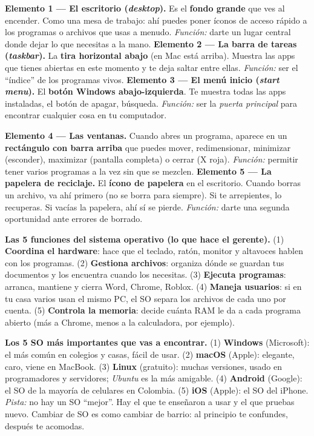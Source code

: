\documentclass[11pt,letterpaper]{article}
\newcommand{\milcpaso}[3]{%
\Needspace{4\baselineskip}%
\begin{tcolorbox}[enhanced,colback=white,colframe=milcLinea,arc=1.5mm,boxrule=.9pt,
  left=14mm,right=4mm,top=3mm,bottom=3mm,before skip=4pt,after skip=4pt,
  fontupper=\RaggedRight,
  overlay={\node[anchor=north west,circle,fill=#2,text=white,inner sep=0pt,
    minimum size=7.4mm,font=\sffamily\bfseries\small]
    at ([xshift=3.6mm,yshift=-3.2mm]frame.north west) {#1};}]
#3
\end{tcolorbox}}
\begin{document}
\milcpaso{1}{milcTurquesa}{\textbf{Elemento 1 --- El escritorio (\emph{desktop}).} Es el \textbf{fondo grande} que ves al encender. Como una mesa de trabajo: ahí puedes poner íconos de acceso rápido a los programas o archivos que usas a menudo. \emph{Función:} darte un lugar central donde dejar lo que necesitas a la mano. \textbf{Elemento 2 --- La barra de tareas (\emph{taskbar}).} La \textbf{tira horizontal abajo} (en Mac está arriba). Muestra las apps que tienes abiertas en este momento y te deja saltar entre ellas. \emph{Función:} ser el ``índice'' de los programas vivos. \textbf{Elemento 3 --- El menú inicio (\emph{start menu}).} El \textbf{botón Windows abajo-izquierda}. Te muestra todas las apps instaladas, el botón de apagar, búsqueda. \emph{Función:} ser la \emph{puerta principal} para encontrar cualquier cosa en tu computador.}
\milcpaso{2}{milcTurquesa}{\textbf{Elemento 4 --- Las ventanas.} Cuando abres un programa, aparece en un \textbf{rectángulo con barra arriba} que puedes mover, redimensionar, minimizar (esconder), maximizar (pantalla completa) o cerrar (X roja). \emph{Función:} permitir tener varios programas a la vez sin que se mezclen. \textbf{Elemento 5 --- La papelera de reciclaje.} El \textbf{ícono de papelera} en el escritorio. Cuando borras un archivo, va ahí primero (no se borra para siempre). Si te arrepientes, lo recuperas. Si vacías la papelera, ahí sí se pierde. \emph{Función:} darte una segunda oportunidad ante errores de borrado.}
\milcpaso{3}{milcTurquesa}{\textbf{Las 5 funciones del sistema operativo (lo que hace el gerente).} (1) \textbf{Coordina el hardware}: hace que el teclado, ratón, monitor y altavoces hablen con los programas. (2) \textbf{Gestiona archivos}: organiza dónde se guardan tus documentos y los encuentra cuando los necesitas. (3) \textbf{Ejecuta programas}: arranca, mantiene y cierra Word, Chrome, Roblox. (4) \textbf{Maneja usuarios}: si en tu casa varios usan el mismo PC, el SO separa los archivos de cada uno por cuenta. (5) \textbf{Controla la memoria}: decide cuánta RAM le da a cada programa abierto (más a Chrome, menos a la calculadora, por ejemplo).}
\milcpaso{4}{milcTurquesa}{\textbf{Los 5 SO más importantes que vas a encontrar.} (1) \textbf{Windows} (Microsoft): el más común en colegios y casas, fácil de usar. (2) \textbf{macOS} (Apple): elegante, caro, viene en MacBook. (3) \textbf{Linux} (gratuito): muchas versiones, usado en programadores y servidores; \emph{Ubuntu} es la más amigable. (4) \textbf{Android} (Google): el SO de la mayoría de celulares en Colombia. (5) \textbf{iOS} (Apple): el SO del iPhone. \emph{Pista:} no hay un SO ``mejor''. Hay el que te enseñaron a usar y el que pruebas nuevo. Cambiar de SO es como cambiar de barrio: al principio te confundes, después te acomodas.}
\end{document}
